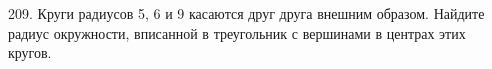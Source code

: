 209. Круги радиусов 5, 6 и 9 касаются друг друга внешним образом. Найдите радиус окружности, вписанной в треугольник с вершинами в центрах этих кругов.\\

